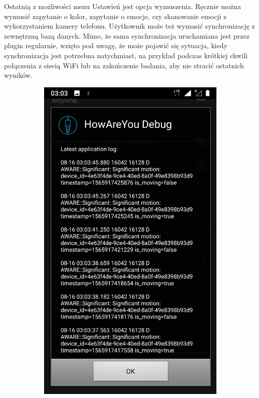 Ostatnią z możliwości menu Ustawień jest opcja wymuszenia. Ręcznie można wymusić zapytanie o kolor, zapytanie o emocje, czy skanowanie emocji z wykorzystaniem kamery telefonu. Użytkownik może też wymusić synchronizację z zewnętrzną bazą danych. Mimo, że sama synchronizacja uruchamiana jest przez plugin regularnie, wzięto pod uwagę, że może pojawić się sytuacja, kiedy synchronizacja jest potrzebna natychmiast, na przykład podczas krótkiej chwili połączenia z siecią WiFi lub na zakończenie badania, aby nie stracić ostatnich wyników.

\begin{figure}[H]
\centering
\begin{subfigure}{0.35\textwidth}
	\centering
	\includegraphics[scale=0.13]{rozdzial3/Ustawienia_logAplikacji.png}

\end{subfigure}
\end{figure}
